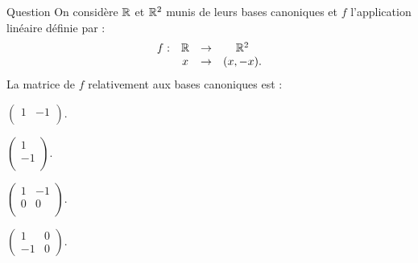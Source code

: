 \begin{multi}[multiple,feedback=
{Soit \({\cal {B}} =\{1\}\) et \({\cal {B}}'=\{e_1,e_2\}\) les bases canoniques de \(\Rr\) et \(\Rr^2\) respectivement. Comme \(f(1)= (1,-1)\), la matrice de \(f\)  relativement à ces bases est la matrice : \(\left(\begin{array}{rc}1\\-1\end{array}\right).\)
}]{Question}
On considère \(\Rr\) et \(\Rr^2\) munis de leurs bases canoniques et \(f\) l'application linéaire définie par :
\[\begin{array}{rccc}f:&\mathbb{R} &\to& \mathbb{R}^2\\
& x&\to &(x,-x).  \end{array}\]
La matrice de \(f\) relativement aux bases canoniques  est :

    \item \(\left(\begin{array}{rc}
1&-1\\
\end{array}\right).\)
    \item* \(\left(\begin{array}{r}
1\\
-1\\
\end{array}\right).\)
    \item \(\left(\begin{array}{rc}
1&-1\\
0&0\\
\end{array}\right).\)
    \item \(\left(\begin{array}{rcc}
1&0\\
-1&0
\end{array}\right).\)
\end{multi}


